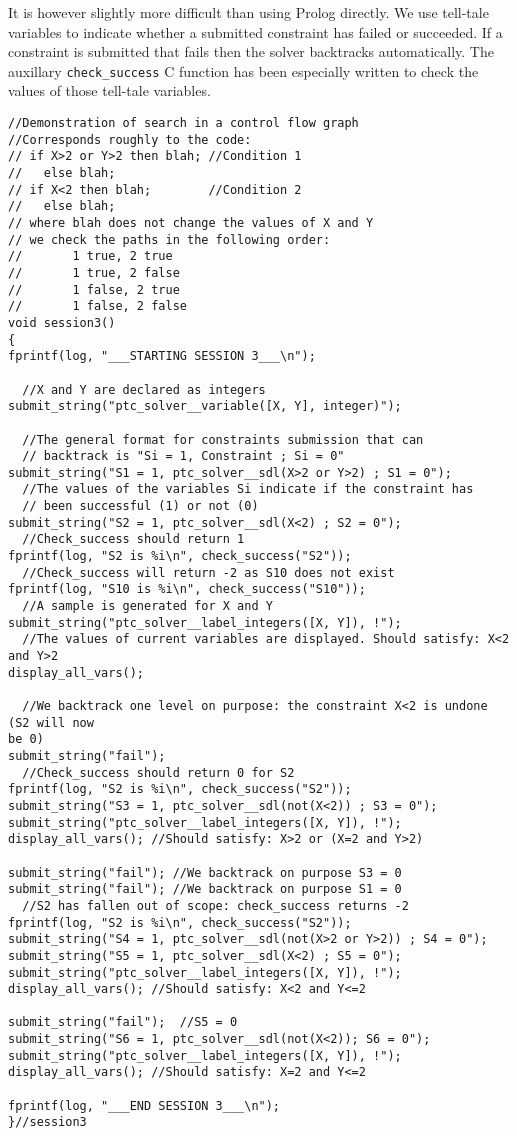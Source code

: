 \documentclass{article}
\begin{document}
It is however slightly more difficult than using Prolog
directly. We use tell-tale variables to indicate whether a submitted constraint
has failed or succeeded. If a constraint is submitted that fails then the solver
backtracks automatically. The auxillary \verb+check_success+ C function has been
especially written to check the values of those tell-tale variables.

\begin{verbatim}
//Demonstration of search in a control flow graph
//Corresponds roughly to the code:
// if X>2 or Y>2 then blah; //Condition 1
//   else blah;
// if X<2 then blah;        //Condition 2
//   else blah;
// where blah does not change the values of X and Y
// we check the paths in the following order:
//       1 true, 2 true
//       1 true, 2 false
//       1 false, 2 true
//       1 false, 2 false
void session3()
{
fprintf(log, "___STARTING SESSION 3___\n");

  //X and Y are declared as integers
submit_string("ptc_solver__variable([X, Y], integer)");

  //The general format for constraints submission that can
  // backtrack is "Si = 1, Constraint ; Si = 0"
submit_string("S1 = 1, ptc_solver__sdl(X>2 or Y>2) ; S1 = 0");
  //The values of the variables Si indicate if the constraint has
  // been successful (1) or not (0)
submit_string("S2 = 1, ptc_solver__sdl(X<2) ; S2 = 0");
  //Check_success should return 1
fprintf(log, "S2 is %i\n", check_success("S2"));
  //Check_success will return -2 as S10 does not exist
fprintf(log, "S10 is %i\n", check_success("S10"));
  //A sample is generated for X and Y
submit_string("ptc_solver__label_integers([X, Y]), !");
  //The values of current variables are displayed. Should satisfy: X<2 and Y>2
display_all_vars();

  //We backtrack one level on purpose: the constraint X<2 is undone (S2 will now
be 0)
submit_string("fail");
  //Check_success should return 0 for S2
fprintf(log, "S2 is %i\n", check_success("S2"));
submit_string("S3 = 1, ptc_solver__sdl(not(X<2)) ; S3 = 0");
submit_string("ptc_solver__label_integers([X, Y]), !");
display_all_vars(); //Should satisfy: X>2 or (X=2 and Y>2)

submit_string("fail"); //We backtrack on purpose S3 = 0
submit_string("fail"); //We backtrack on purpose S1 = 0
  //S2 has fallen out of scope: check_success returns -2
fprintf(log, "S2 is %i\n", check_success("S2"));
submit_string("S4 = 1, ptc_solver__sdl(not(X>2 or Y>2)) ; S4 = 0");
submit_string("S5 = 1, ptc_solver__sdl(X<2) ; S5 = 0");
submit_string("ptc_solver__label_integers([X, Y]), !");
display_all_vars(); //Should satisfy: X<2 and Y<=2

submit_string("fail");  //S5 = 0
submit_string("S6 = 1, ptc_solver__sdl(not(X<2)); S6 = 0");
submit_string("ptc_solver__label_integers([X, Y]), !");
display_all_vars(); //Should satisfy: X=2 and Y<=2

fprintf(log, "___END SESSION 3___\n");
}//session3
\end{verbatim}
\end{document}
